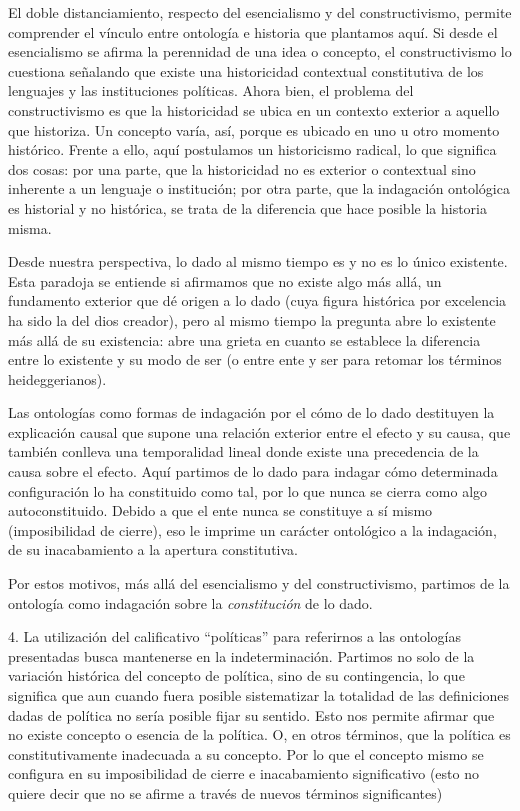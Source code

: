 \documentclass{book}
\begin{document}
El doble distanciamiento, respecto del esencialismo y del
constructivismo, permite comprender el vínculo entre ontología e
historia que plantamos aquí. Si desde el esencialismo se afirma la
perennidad de una idea o concepto, el constructivismo lo cuestiona
señalando que existe una historicidad contextual constitutiva de los
lenguajes y las instituciones políticas. Ahora bien, el problema del
constructivismo es que la historicidad se ubica en un contexto exterior
a aquello que historiza. Un concepto varía, así, porque es ubicado en
uno u otro momento histórico. Frente a ello, aquí postulamos un
historicismo radical, lo que significa dos cosas: por una parte, que la
historicidad no es exterior o contextual sino inherente a un lenguaje o
institución; por otra parte, que la indagación ontológica es historial y
no histórica, se trata de la diferencia que hace posible la historia
misma.

Desde nuestra perspectiva, lo dado al mismo tiempo es y no es lo único
existente. Esta paradoja se entiende si afirmamos que no existe algo más
allá, un fundamento exterior que dé origen a lo dado (cuya figura
histórica por excelencia ha sido la del dios creador), pero al mismo
tiempo la pregunta abre lo existente más allá de su existencia: abre una
grieta en cuanto se establece la diferencia entre lo existente y su modo
de ser (o entre ente y ser para retomar los términos heideggerianos).

Las ontologías como formas de indagación por el cómo de lo dado
destituyen la explicación causal que supone una relación exterior entre
el efecto y su causa, que también conlleva una temporalidad lineal donde
existe una precedencia de la causa sobre el efecto. Aquí partimos de lo
dado para indagar cómo determinada configuración lo ha constituido como
tal, por lo que nunca se cierra como algo autoconstituido. Debido a que
el ente nunca se constituye a sí mismo (imposibilidad de cierre), eso le
imprime un carácter ontológico a la indagación, de su inacabamiento a la
apertura constitutiva.

Por estos motivos, más allá del esencialismo y del constructivismo,
partimos de la ontología como indagación sobre la \emph{constitución} de
lo dado.

4. La utilización del calificativo \enquote{políticas} para referirnos a las
ontologías presentadas busca mantenerse en la indeterminación. Partimos
no solo de la variación histórica del concepto de política, sino de su
contingencia, lo que significa que aun cuando fuera posible sistematizar
la totalidad de las definiciones dadas de política no sería posible
fijar su sentido. Esto nos permite afirmar que no existe concepto o
esencia de la política. O, en otros términos, que la política es
constitutivamente inadecuada a su concepto. Por lo que el concepto mismo
se configura en su imposibilidad de cierre e inacabamiento significativo
(esto no quiere decir que no se afirme a través de nuevos términos
significantes)
\end{document}
